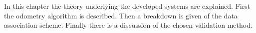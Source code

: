 In this chapter the theory underlying the developed systems are explained. First the odometry algorithm is described. Then a breakdown is given of the data association scheme. Finally there is a discussion of the chosen validation method.